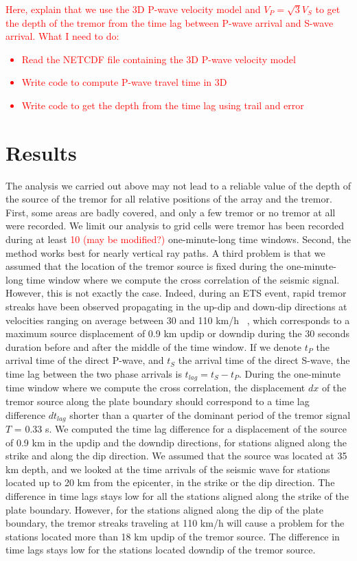 \documentclass[draft]{agujournal2019}
\begin{document}
\textcolor{red}{Here, explain that we use the 3D P-wave velocity model and $V_P = \sqrt{3} V_S$ to get the depth of the tremor from the time lag between P-wave arrival and S-wave arrival.
What I need to do:
\begin{itemize}
\item Read the NETCDF file containing the 3D P-wave velocity model
\item Write code to compute P-wave travel time in 3D
\item Write code to get the depth from the time lag using trail and error
\end{itemize}
}

\section{Results}

The analysis we carried out above may not lead to a reliable value of the depth of the source of the tremor for all relative positions of the array and the tremor. First, some areas are badly covered, and only a few tremor or no tremor at all were recorded. We limit our analysis to grid cells were tremor has been recorded during at least \textcolor{red}{10 (may be modified?)} one-minute-long time windows. Second, the method works best for nearly vertical ray paths. A third problem is that we assumed that the location of the tremor source is fixed during the one-minute-long time window where we compute the cross correlation of the seismic signal. However, this is not exactly the case. Indeed, during an ETS event, rapid tremor streaks have been observed propagating in the up-dip and down-dip directions at velocities ranging on average between 30 and 110 km/h ~\cite{GHO_2010_G3}, which corresponds to a maximum source displacement of 0.9 km updip or downdip during the 30 seconds duration before and after the middle of the time window. If we denote $t_P$ the arrival time of the direct P-wave, and $t_S$ the arrival time of the direct S-wave, the time lag between the two phase arrivals is $t_{lag} = t_S - t_P$. During the one-minute time window where we compute the cross correlation, the displacement $dx$ of the tremor source along the plate boundary should correspond to a time lag difference $dt_{lag}$ shorter than a quarter of the dominant period of the tremor signal $T$ = 0.33 s. We computed the time lag difference for a displacement of the source of 0.9 km in the updip and the downdip directions, for stations aligned along the strike and along the dip direction. We assumed that the source was located at 35 km depth, and we looked at the time arrivals of the seismic wave for stations located up to 20 km from the epicenter, in the strike or the dip direction. The difference in time lags stays low for all the stations aligned along the strike of the plate boundary. However, for the stations aligned along the dip of the plate boundary, the tremor streaks traveling at 110 km/h will cause a problem for the stations located more than 18 km updip of the tremor source. The difference in time lags stays low for the stations located downdip of the tremor source. \\
\end{document}
